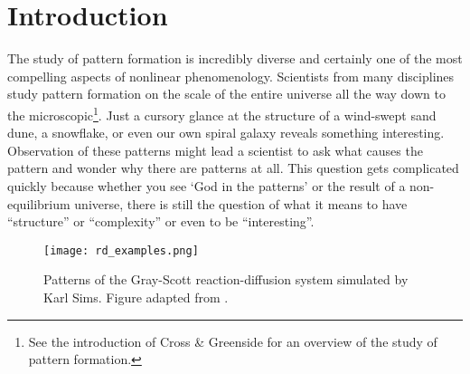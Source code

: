 		
\chapter*{Introduction}
The study of pattern formation is incredibly diverse and certainly one of the most compelling aspects of nonlinear phenomenology. Scientists from many disciplines study pattern formation on the scale of the entire universe all the way down to the microscopic\footnote{See the introduction of Cross \& Greenside for an overview of the study of pattern formation.}. Just a cursory glance at the structure of a wind-swept sand dune, a snowflake, or even our own spiral galaxy reveals something interesting. Observation of these patterns might lead a scientist to ask what causes the pattern and wonder why there are patterns at all. This question gets complicated quickly because whether you see `God in the patterns' or the result of a non-equilibrium universe, there is still the question of what it means to have ``structure'' or ``complexity'' or even to be ``interesting''.
%
\begin{figure}[h]
	\centering
	\texttt{[image: rd\_examples.png]}
	\caption{Patterns of the Gray-Scott reaction-diffusion system simulated by Karl Sims. Figure adapted from \protect{}.}
	\label{fig:karl_sims}
\end{figure}

